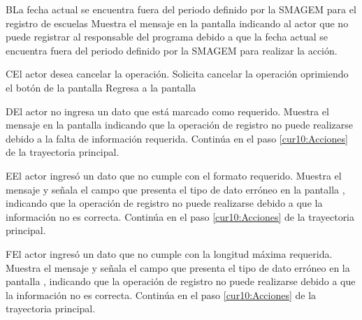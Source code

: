  \begin{UCtrayectoriaA}{B}{La fecha actual se encuentra fuera del periodo definido por la SMAGEM para el registro de escuelas}
    \UCpaso[\UCsist] Muestra el mensaje  en la pantalla  indicando al actor que no puede registrar al responsable del programa debido a que la fecha actual se encuentra fuera del periodo definido por la SMAGEM para realizar la acción.
 \end{UCtrayectoriaA}

\begin{UCtrayectoriaA}{C}{El actor desea cancelar la operación.}
    \UCpaso[\UCactor] Solicita cancelar la operación oprimiendo el botón   de la pantalla 
    \UCpaso[\UCsist] Regresa a la pantalla 
	
 \end{UCtrayectoriaA} 
 
 \begin{UCtrayectoriaA}{D}{El actor no ingresa un dato que está marcado como requerido.}
    \UCpaso[\UCsist] Muestra el mensaje  en la pantalla  indicando que la operación de registro no puede realizarse debido a la falta de información requerida.
        \UCpaso Continúa en el paso \ref{cur10:Acciones} de la trayectoria principal.
	
 \end{UCtrayectoriaA}
 
  \begin{UCtrayectoriaA}{E}{El actor ingresó un dato que no cumple con el formato requerido.}
    \UCpaso[\UCsist] Muestra el mensaje  y señala el campo que presenta el tipo de dato erróneo en la pantalla , indicando que la operación de registro no puede realizarse debido a que la información no es correcta. 
    \UCpaso Continúa en el paso \ref{cur10:Acciones} de la trayectoria principal.
 \end{UCtrayectoriaA}

 \begin{UCtrayectoriaA}{F}{El actor ingresó un dato que no cumple con la longitud máxima requerida.}
    \UCpaso[\UCsist] Muestra el mensaje  y señala el campo que presenta el tipo de dato erróneo en la pantalla , indicando que la operación de registro no puede realizarse debido a que la información no es correcta. 
    \UCpaso Continúa en el paso \ref{cur10:Acciones} de la trayectoria principal.
 \end{UCtrayectoriaA}
 
